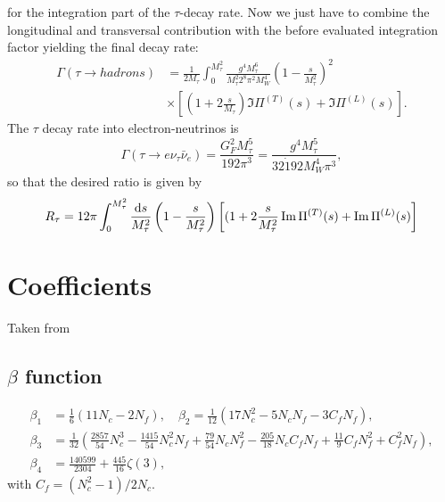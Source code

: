 for the integration part of the $\tau$-decay rate. Now we just have to combine the longitudinal and transversal contribution with the before evaluated integration factor yielding the final decay rate:
\begin{equation}
	\begin{split}
		\Gamma(\tau\to hadrons) &= \frac{1}{2 M_\tau} \int_0^{M_\tau^2} \frac{g^4 M_\tau^6}{M_\tau^2 2^8 \pi^2 M_W^4} \left(1-\frac{s}{M_\tau^2}\right)^2 \\
		& \times \left[ \left(1 + 2 \frac{s}{M_\tau}\right) \Im \Pi^{(T)}(s) + \Im \Pi^{(L)}(s) \right].
	\end{split}
\end{equation}
The $\tau$ decay rate into electron-neutrinos is
\begin{equation}
	\Gamma(\tau\to e \nu_\tau \bar \nu_e ) = \frac{G_F^2 M_\tau^5}{192 \pi^3} = \frac{g^4 M_\tau^5}{32 \dot 192 M_W^4 \pi^3},
\end{equation}
so that the desired ratio is given by
\begin{equation}
		R_\tau = 12 \pi \int_0^{M_\tau^2} \frac{\mathop{}\!\mathrm{d} s}{M_\tau^2} \left(1-\frac{s}{M_\tau^2}\right) \left[(1+2 \frac{s}		{M_\tau^2}\Im \Pi^{(T)}(s) + \Im\Pi^{(L)}(s) \right]
\end{equation}	


\section{Coefficients}
\label{app:coefficients}
Taken from \cite{Diogo2011} \\

\subsection{$\beta$ function}
\begin{equation}
	\begin{split}
		\beta_1 &= \frac{1}{6} (11 N_c - 2 N_f), \quad \beta_2 = \frac{1}{12} ( 17 N_c^2 - 5 N_c N_f - 3 C_f N_f), \\
		\beta_3 &= \frac{1}{32} \left(\frac{2857}{54} N_c^3 - \frac{1415}{54} N_c^2 N_f + \frac{79}{54} N_c N_f^2 - \frac{205}{18} N_c C_f N_f + \frac{11}{9} C_f N_f^2 + C_f^2 N_f \right), \\
		\beta_4 &= \frac{140599}{2304} + \frac{445}{16}\zeta(3),
	\end{split}
\end{equation}	
with $C_f = (N_c^2 - 1)/2N_c$.

